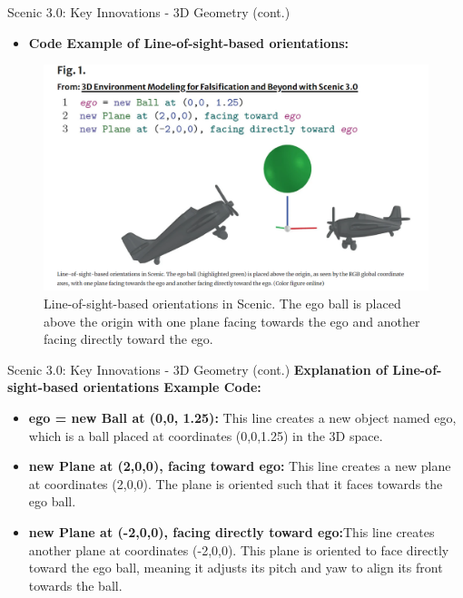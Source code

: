 \documentclass{beamer}
\begin{document}
\begin{frame}{Scenic 3.0: Key Innovations - 3D Geometry (cont.)}
  \begin{itemize}
  \setlength{\itemindent}{-1em} 
    \item \textbf{Code Example of Line-of-sight-based orientations:}
  \end{itemize}
\begin{figure}
\centering
\includegraphics[width=0.7\linewidth]{FIG1.png}
\caption{Line-of-sight-based orientations in Scenic. The ego ball is placed above the origin with one plane facing towards the ego and another facing directly toward the ego.}
\label{fig:line-of-sight}
\end{figure}
\end{frame}

\begin{frame}{Scenic 3.0: Key Innovations - 3D Geometry (cont.)}
    \textbf{Explanation of Line-of-sight-based orientations Example Code:}\\
    \begin{itemize}
        \setlength{\itemindent}{-1em} 
        \item \textbf{ego = new Ball at (0,0, 1.25):} This line creates a new object named ego, which is a ball placed at coordinates (0,0,1.25) in the 3D space.
        \item \textbf{new Plane at (2,0,0), facing toward ego:} This line creates a new plane at coordinates (2,0,0). The plane is oriented such that it faces towards the ego ball.
        \item \textbf{new Plane at (-2,0,0), facing directly toward ego:}This line creates another plane at coordinates (-2,0,0). This plane is oriented to face directly toward the ego ball, meaning it adjusts its pitch and yaw to align its front towards the ball.
    \end{itemize}
\end{frame}
\end{document}
